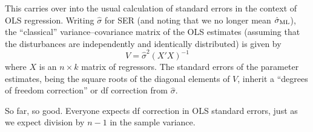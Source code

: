 \documentclass{article}
\begin{document}
This carries over into the usual calculation of standard errors in the
context of OLS regression.  Writing $\hat{\sigma}$ for SER (and noting
that we no longer mean $\hat{\sigma}_{\textrm{\scriptsize ML}}$), the ``classical''
variance--covariance matrix of the OLS estimates (assuming that the
disturbances are independently and identically distributed) is given
by
%
\[
V = \hat{\sigma}^2 (X'X)^{-1}
\]
%
where $X$ is an $n\times k$ matrix of regressors. The standard errors
of the parameter estimates, being the square roots of the diagonal
elements of $V$, inherit a ``degrees of freedom correction'' or
df correction from $\hat{\sigma}$.

So far, so good.  Everyone expects df correction in OLS standard
errors, just as we expect division by $n-1$ in the sample variance.
\end{document}
